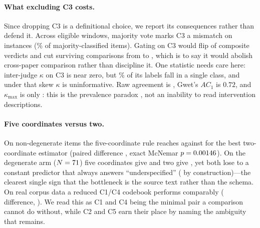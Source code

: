 \paragraph{What excluding C3 costs.}
Since dropping C3 is a definitional choice, we report its consequences rather than defend it.
Across \CensusEligible{} eligible windows, majority vote marks C3 a mismatch on
\CthreeMismatchCount{} instances (\CThreeMismatchMaj\% of majority-classified items). Gating on
C3 would flip \CthreeGateChanged{} of \CthreeGateN{} composite verdicts and cut surviving
comparisons from \CthreeSurvWithout{} to \CthreeSurvWith{}, which is to say it would abolish
cross-paper comparison rather than discipline it. One statistic needs care here: inter-judge
$\kappa$ on C3 is near zero, but \PrevCThree\% of its labels fall in a single class, and under
that skew $\kappa$ is uninformative. Raw agreement is \ObsCThree{}, Gwet's $AC_1$ is $0.72$, and
$\kappa_{\max}$ is only \KmaxCThree{}: this is the prevalence paradox \citep{sim2005kappa}, not
an inability to read intervention descriptions.

\paragraph{Five coordinates versus two.}
On non-degenerate items the five-coordinate rule reaches \InsFiveAcc{} against \InsBestTwoAcc{}
for the best two-coordinate estimator (paired difference \InsFiveVsTwoDiff{}, exact McNemar
$p=0.00146$). On the degenerate arm ($N=71$) five coordinates give \InsForceFive{}
and two give \InsForceTwo{}, yet both lose to a constant predictor that always answers
``underspecified'' (\InsForceBase{} by construction)---the clearest single sign that the
bottleneck is the source text rather than the schema. On real corpus data a reduced C1/C4
codebook performs comparably (\AblCFourDelta{} difference, \AblCFourCI{}). We read this as C1 and
C4 being the minimal pair a comparison cannot do without, while C2 and C5 earn their place by
naming the ambiguity that remains.
